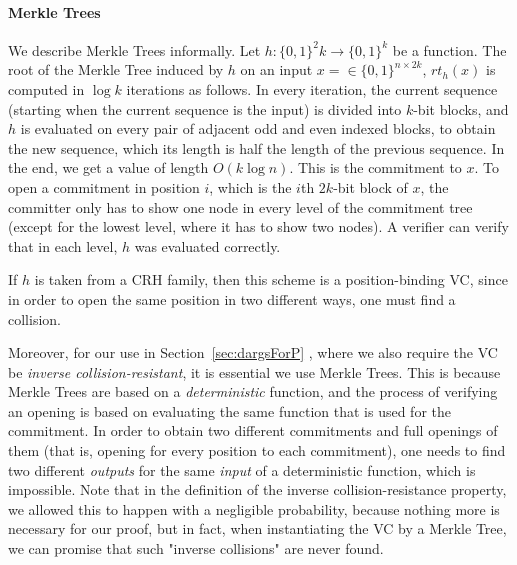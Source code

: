 \paragraph{Merkle Trees} We describe Merkle Trees informally. Let $h:\{0,1\}^2k\to\{0,1\}^k$ be a function. The root of the Merkle Tree induced by $h$ on an input $x = \in\{0,1\}^{n\times 2k}$, $rt_h(x)$ is computed in $\log k$ iterations as follows. In every iteration, the current sequence (starting when the current sequence is the input) is divided into $k$-bit blocks, and $h$ is evaluated on every pair of adjacent odd and even indexed blocks, to obtain the new sequence, which its length is half the length of the previous sequence. In the end, we get a value of length $O(k \log n)$. This is the commitment to $x$. To open a commitment in position $i$, which is the $i$th $2k$-bit block of $x$, the committer only has to show one node in every level of the commitment tree (except for the lowest level, where it has to show two nodes). A verifier can verify that in each level, $h$ was evaluated correctly.

If $h$ is taken from a CRH family, then this scheme is a position-binding VC, since in order to open the same position in two different ways, one must find a collision.

Moreover, for our use in Section~\ref{sec:dargsForP} , where we also require the VC be \emph{inverse collision-resistant}, it is essential we use Merkle Trees. This is because Merkle Trees are based on a \emph{deterministic} function, and the process of verifying an opening is based on evaluating the same function that is used for the commitment. In order to obtain two different commitments and full openings of them (that is, opening for every position to each commitment), one needs to find two different \emph{outputs} for the same \emph{input} of a deterministic function, which is impossible. Note that in the definition of the inverse collision-resistance property, we allowed this to happen with a negligible probability, because nothing more is necessary for our proof, but in fact, when instantiating the VC by a Merkle Tree, we can promise that such "inverse collisions" are never found.








